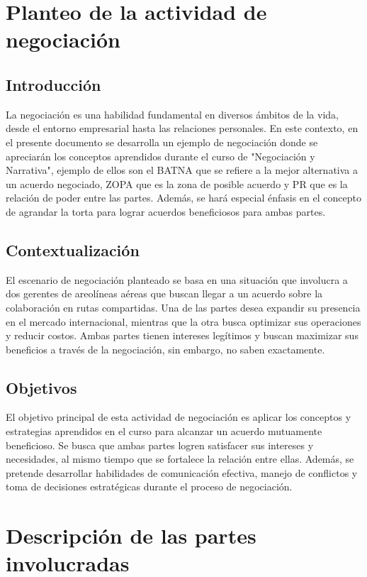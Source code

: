 \section{Planteo de la actividad de negociación}
\label{sec:introduccion}
\subsection{Introducción}

La negociación es una habilidad fundamental en diversos ámbitos de la vida, desde el entorno empresarial hasta las relaciones personales. En este contexto, en el presente documento se desarrolla un ejemplo de negociación donde se apreciarán los conceptos aprendidos durante el curso de "Negociación y Narrativa", ejemplo de ellos son el BATNA que se refiere a la mejor alternativa a un acuerdo negociado, ZOPA que es la zona de posible acuerdo y PR que es la relación de poder entre las partes. Además, se hará especial énfasis en el concepto de agrandar la torta para lograr acuerdos beneficiosos para ambas partes.

\subsection{Contextualización}

El escenario de negociación planteado se basa en una situación que involucra a dos gerentes de areolíneas aéreas que buscan llegar a un acuerdo sobre la colaboración en rutas compartidas. Una de las partes desea expandir su presencia en el mercado internacional, mientras que la otra busca optimizar sus operaciones y reducir costos. Ambas partes tienen intereses legítimos y buscan maximizar sus beneficios a través de la negociación, sin embargo, no saben exactamente.

\subsection{Objetivos}

El objetivo principal de esta actividad de negociación es aplicar los conceptos y estrategias aprendidos en el curso para alcanzar un acuerdo mutuamente beneficioso. Se busca que ambas partes logren satisfacer sus intereses y necesidades, al mismo tiempo que se fortalece la relación entre ellas. Además, se pretende desarrollar habilidades de comunicación efectiva, manejo de conflictos y toma de decisiones estratégicas durante el proceso de negociación.

\section{Descripción de las partes involucradas}

